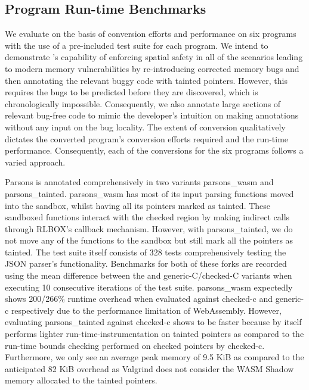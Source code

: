 \subsection{Program Run-time Benchmarks}
We evaluate \systemname on the basis of conversion efforts and performance on six programs with the use of a pre-included test suite for each program. We intend to demonstrate \systemname's capability of enforcing spatial safety in all of the scenarios leading to modern memory vulnerabilities by re-introducing corrected memory bugs and then annotating the relevant buggy code with tainted pointers. However, this requires the bugs to be predicted before they are discovered, which is chronologically impossible. Consequently, we also annotate large sections of relevant bug-free code to mimic the developer's intuition on making \systemname annotations without any input on the bug locality. The extent of conversion qualitatively dictates the converted program's conversion efforts required and the run-time performance. Consequently, each of the conversions for the six programs follows a varied approach. 

Parsons is annotated comprehensively in two variants parsons\_wasm and parsons\_tainted. parsons\_wasm has most of its input parsing functions moved into the sandbox, whilst having all its pointers marked as tainted. These sandboxed functions interact with the checked region by making indirect calls through RLBOX's callback mechanism. However, with parsons\_tainted, we do not move any of the functions to the sandbox but still mark all the pointers as tainted. The test suite itself consists of 328 tests comprehensively testing the JSON parser's functionality. Benchmarks for both of these forks are recorded using the mean difference between the \systemname and generic-C/checked-C variants when executing 10 consecutive iterations of the test suite. parsons\_wasm expectedly shows 200/266\% runtime overhead when evaluated against checked-c and generic-c respectively due to the performance limitation of WebAssembly. However, evaluating parsons\_tainted against checked-c shows \systemname to be faster because \systemname by itself performs lighter run-time-instrumentation on tainted pointers as compared to the run-time bounds checking performed on checked pointers by checked-c. Furthermore, we only see an average peak memory of 9.5 KiB as compared to the anticipated 82 KiB overhead as Valgrind does not consider the WASM Shadow memory allocated to the tainted pointers.

